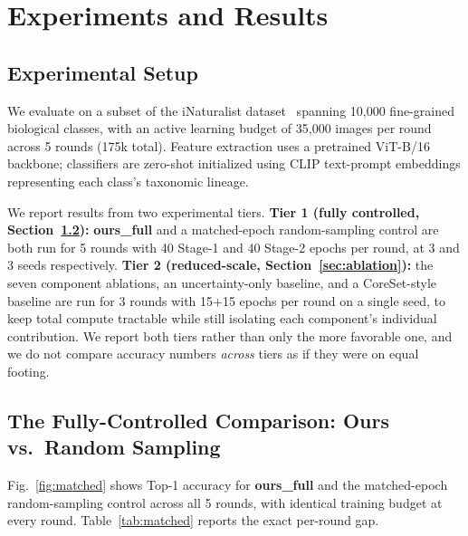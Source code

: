 \documentclass[conference]{IEEEtran}
\begin{document}
\section{Experiments and Results}
\label{sec:experiments}

\subsection{Experimental Setup}
We evaluate on a subset of the iNaturalist dataset~\cite{vanhorn2018inaturalist} spanning 10,000 fine-grained biological classes, with an active learning budget of 35,000 images per round across 5 rounds (175k total). Feature extraction uses a pretrained ViT-B/16 backbone; classifiers are zero-shot initialized using CLIP text-prompt embeddings representing each class's taxonomic lineage.

We report results from two experimental tiers. \textbf{Tier 1 (fully controlled, Section~\ref{sec:matched}):} \textbf{ours\_full} and a matched-epoch random-sampling control are both run for 5 rounds with 40 Stage-1 and 40 Stage-2 epochs per round, at 3 and 3 seeds respectively. \textbf{Tier 2 (reduced-scale, Section~\ref{sec:ablation}):} the seven component ablations, an uncertainty-only baseline, and a CoreSet-style baseline are run for 3 rounds with 15+15 epochs per round on a single seed, to keep total compute tractable while still isolating each component's individual contribution. We report both tiers rather than only the more favorable one, and we do not compare accuracy numbers \emph{across} tiers as if they were on equal footing.

\subsection{The Fully-Controlled Comparison: Ours vs.\ Random Sampling}
\label{sec:matched}
Fig.~\ref{fig:matched} shows Top-1 accuracy for \textbf{ours\_full} and the matched-epoch random-sampling control across all 5 rounds, with identical training budget at every round. Table~\ref{tab:matched} reports the exact per-round gap.
\end{document}
